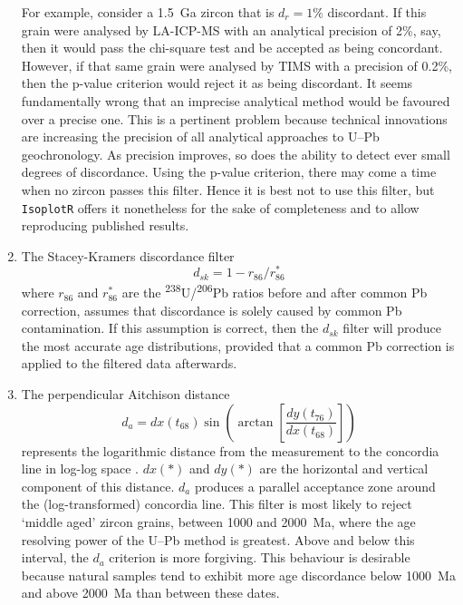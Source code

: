 \begin{refsection}
\begin{enumerate}
    For example, consider a 1.5~Ga zircon that is $d_r=1\%$
    discordant. If this grain were analysed by LA-ICP-MS with an
    analytical precision of 2\%, say, then it would pass the
    chi-square test and be accepted as being concordant. However, if
    that same grain were analysed by TIMS with a precision of 0.2\%,
    then the p-value criterion would reject it as being discordant. It
    seems fundamentally wrong that an imprecise analytical method
    would be favoured over a precise one. This is a pertinent problem
    because technical innovations are increasing the precision of all
    analytical approaches to U--Pb geochronology.  As precision
    improves, so does the ability to detect ever small degrees of
    discordance. Using the p-value criterion, there may come a time
    when no zircon passes this filter.  Hence it is best not to use
    this filter, but \texttt{IsoplotR} offers it nonetheless for the
    sake of completeness and to allow reproducing published results.
  \item The Stacey-Kramers discordance filter
    \begin{equation}
      d_{sk} = 1 - r_{86}/r_{86}^\ast
    \end{equation}
    \noindent where $r_{86}$ and $r_{86}^\ast$ are the
    \textsuperscript{238}U/\textsuperscript{206}Pb ratios before and
    after common Pb correction, assumes that discordance is solely
    caused by common Pb contamination. If this assumption is correct,
    then the $d_{sk}$ filter will produce the most accurate age
    distributions, provided that a \citet{stacey1975} common Pb
    correction is applied to the filtered data afterwards.
  \item The perpendicular Aitchison distance
    \begin{equation}
      d_{a} = dx(t_{68}) \sin\!\left(\arctan\!\left[
        \frac{dy(t_{76})}{dx(t_{68})} \right] \right)
    \end{equation}
    \noident represents the logarithmic distance from the measurement
    to the concordia line in log-log space
    \citep{vermeesch2020}. $dx(\ast)$ and $dy(\ast)$ are the
    horizontal and vertical component of this distance. $d_a$ produces
    a parallel acceptance zone around the (log-transformed) concordia
    line. This filter is most likely to reject `middle aged' zircon
    grains, between 1000 and 2000~Ma, where the age resolving power of
    the U--Pb method is greatest. Above and below this interval, the
    $d_a$ criterion is more forgiving. This behaviour is desirable
    because natural samples tend to exhibit more age discordance below
    1000~Ma and above 2000~Ma than between these dates.


\end{enumerate}
\end{refsection}
